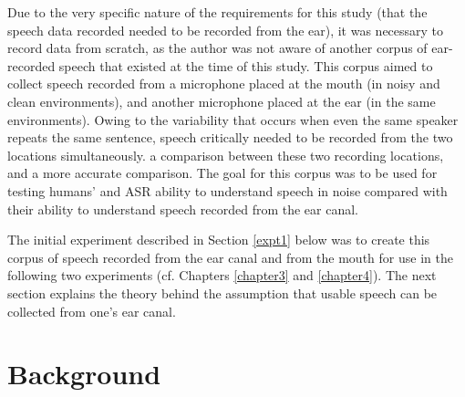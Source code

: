 Due to the very specific nature of the requirements for this study (that the speech data recorded needed to be recorded from the ear), it was necessary to record data from scratch, as the author was not aware of another corpus of ear-recorded speech that existed at the time of this study.  This corpus aimed to collect speech recorded from a microphone placed at the mouth (in noisy and clean environments), and another microphone placed at the ear (in the same environments). Owing to the variability that occurs when even the same speaker repeats the same sentence, speech critically needed to be recorded from the two locations simultaneously.  \DIFdelbegin {}\DIFdelend \DIFaddbegin {}\DIFaddend a comparison between these two recording locations, and \DIFdelbegin {}\DIFdelend \DIFaddbegin {}\DIFaddend a more accurate comparison.  The goal for this corpus was to be used for testing humans' and ASR ability to understand speech in noise compared with their ability to understand speech recorded from the ear canal.


The \DIFaddbegin {}\DIFaddend initial experiment described in Section \ref{expt1} below was \DIFdelbegin {}\DIFdelend to create this corpus of speech recorded from the ear canal and from the mouth for use in the following two experiments (cf. Chapters \ref{chapter3} and \ref{chapter4}).  The next section explains the theory behind the assumption that usable speech can be collected from \DIFdelbegin {}\DIFdelend \DIFaddbegin {}\DIFaddend one's ear canal.

\section{Background}



